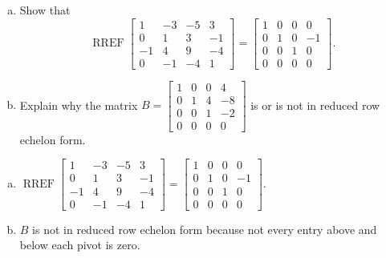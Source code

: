 
\begin{exerciseStatement}

\begin{enumerate}[(a)]
\item Show that \[\operatorname{RREF} \left[\begin{array}{cccc}
1 & -3 & -5 & 3 \\
0 & 1 & 3 & -1 \\
-1 & 4 & 9 & -4 \\
0 & -1 & -4 & 1
\end{array}\right] = \left[\begin{array}{cccc}
1 & 0 & 0 & 0 \\
0 & 1 & 0 & -1 \\
0 & 0 & 1 & 0 \\
0 & 0 & 0 & 0
\end{array}\right] .\]
\item Explain why the matrix \(B= \left[\begin{array}{cccc}
1 & 0 & 0 & 4 \\
0 & 1 & 4 & -8 \\
0 & 0 & 1 & -2 \\
0 & 0 & 0 & 0
\end{array}\right] \) is or is not in reduced row echelon form.
\end{enumerate}
    
\end{exerciseStatement}
    
\begin{exerciseAnswer} 

\begin{enumerate}[(a)]
\item \(\operatorname{RREF} \left[\begin{array}{cccc}
1 & -3 & -5 & 3 \\
0 & 1 & 3 & -1 \\
-1 & 4 & 9 & -4 \\
0 & -1 & -4 & 1
\end{array}\right] = \left[\begin{array}{cccc}
1 & 0 & 0 & 0 \\
0 & 1 & 0 & -1 \\
0 & 0 & 1 & 0 \\
0 & 0 & 0 & 0
\end{array}\right] .\)
\item \(B\) is not in reduced row echelon form because not every entry above and below each pivot is zero. 
\end{enumerate}
    
\end{exerciseAnswer}
    
